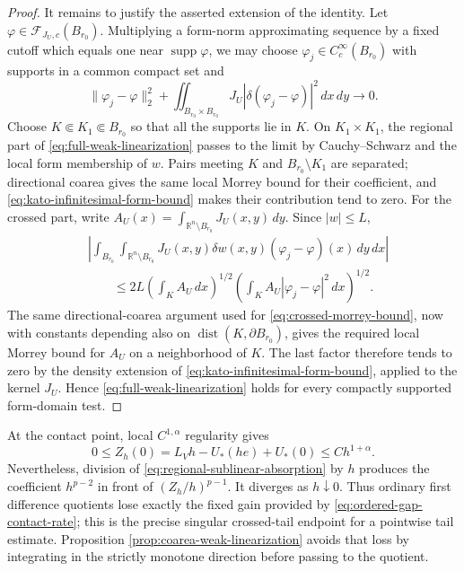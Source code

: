 \documentclass[11pt,reqno]{amsart}
\numberwithin{equation}{section}
\newcommand{\R}{\mathbb R}
\newcommand{\dd}{\,d}
\theoremstyle{remark}
\begin{document}
\begin{proof}
It remains to justify the asserted extension of the identity.  Let
\(\varphi\in\mathcal F_{J_U,c}(B_{r_0})\).  Multiplying a form-norm
approximating sequence by a fixed cutoff which equals one near
\(\operatorname{supp}\varphi\), we may choose
\(\varphi_j\in C_c^\infty(B_{r_0})\) with supports in a common compact
set and
\[
 \|\varphi_j-\varphi\|_2^2
 +\iint_{B_{r_0}\times B_{r_0}}J_U
       |\delta(\varphi_j-\varphi)|^2\dd x\!\dd y\longrightarrow0.
\]
Choose \(K\Subset K_1\Subset B_{r_0}\) so that all the supports lie in
\(K\).  On \(K_1\times K_1\), the regional part of
\eqref{eq:full-weak-linearization} passes to the limit by
Cauchy--Schwarz and the local form membership of \(w\).  Pairs meeting
\(K\) and \(B_{r_0}\setminus K_1\) are separated; directional coarea
gives the same local Morrey bound for their coefficient, and
\eqref{eq:kato-infinitesimal-form-bound} makes their contribution tend
to zero.  For the crossed part, write
\(A_U(x)=\int_{\R^n\setminus B_{r_0}}
J_U(x,y)\dd y\).  Since \(|w|\le L\),
\begin{align*}
 &\left|\int_{B_{r_0}}\int_{\R^n\setminus B_{r_0}}
 J_U(x,y)\delta w(x,y)(\varphi_j-\varphi)(x)\dd y\!\dd x\right|\\
 &\qquad\le2L
 \left(\int_KA_U\dd x\right)^{1/2}
 \left(\int_KA_U|\varphi_j-\varphi|^2\dd x\right)^{1/2}.
\end{align*}
The same
directional-coarea argument used for \eqref{eq:crossed-morrey-bound},
now with constants depending also on
\(\operatorname{dist}(K,\partial B_{r_0})\), gives the required local
Morrey bound for \(A_U\) on a neighborhood of \(K\).  The last factor
therefore tends to zero by the density extension of
\eqref{eq:kato-infinitesimal-form-bound}, applied to the kernel
\(J_U\).  Hence
\eqref{eq:full-weak-linearization} holds for every compactly supported
form-domain test.
\end{proof}

At the contact point, local $C^{1,\alpha}$ regularity gives
\begin{equation}
 0\le Z_h(0)=L_Vh-U_*(he)+U_*(0)\le C h^{1+\alpha}.
 \label{eq:ordered-gap-contact-rate}
\end{equation}
Nevertheless, division of
\eqref{eq:regional-sublinear-absorption} by $h$ produces the coefficient
$h^{p-2}$ in front of $(Z_h/h)^{p-1}$.  It diverges as $h\downarrow0$.
Thus ordinary first difference quotients lose exactly the fixed gain
provided by \eqref{eq:ordered-gap-contact-rate}; this is the precise
singular crossed-tail endpoint for a pointwise tail estimate.  Proposition
\ref{prop:coarea-weak-linearization} avoids that loss by integrating in
the strictly monotone direction before passing to the quotient.
\end{document}
